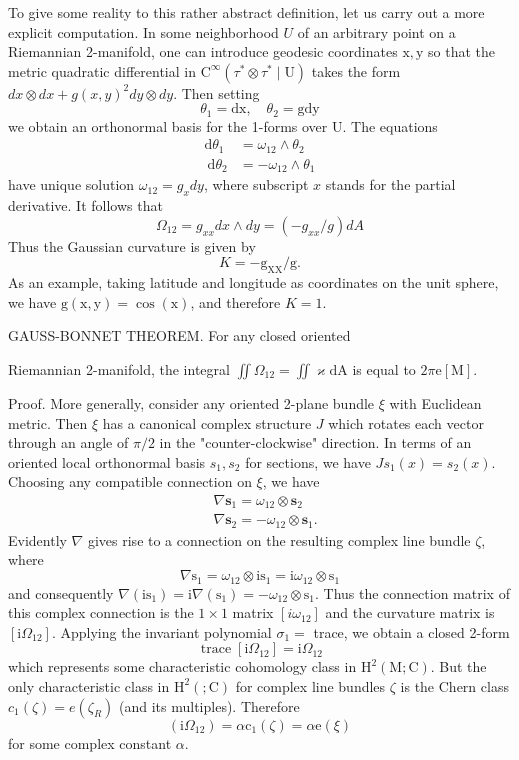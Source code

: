 \documentclass[10pt]{article}
\begin{document}
To give some reality to this rather abstract definition, let us carry out a more explicit computation. In some neighborhood $U$ of an arbitrary point on a Riemannian 2-manifold, one can introduce geodesic coordinates $\mathrm{x}, \mathrm{y}$ so that the metric quadratic differential in $\mathrm{C}^{\infty}\left(\tau^{*} \otimes \tau^{*} \mid \mathrm{U}\right)$ takes the form $d x \otimes d x+g(x, y)^{2} d y \otimes d y$. Then setting
$$
\theta_{1}=\mathrm{dx}, \quad \theta_{2}=\mathrm{gdy}
$$
we obtain an orthonormal basis for the 1-forms over U. The equations
$$
\begin{aligned}
\mathrm{d} \theta_{1} &=\omega_{12} \wedge \theta_{2} \\
\mathrm{~d} \theta_{2} &=-\omega_{12} \wedge \theta_{1}
\end{aligned}
$$
have unique solution $\omega_{12}=g_{x} d y$, where subscript $x$ stands for the partial derivative. It follows that
$$
\Omega_{12}=g_{x x} d x \wedge d y=\left(-g_{x x} / g\right) d A
$$
Thus the Gaussian curvature is given by
$$
K=-\mathrm{g}_{\mathrm{XX}} / \mathrm{g} .
$$
As an example, taking latitude and longitude as coordinates on the unit sphere, we have $\mathrm{g}(\mathrm{x}, \mathrm{y})=\cos (\mathrm{x})$, and therefore $K=1$.

GAUSS-BONNET THEOREM. For any closed oriented

Riemannian 2-manifold, the integral $\iint \Omega_{12}=\iint \varkappa \mathrm{dA}$ is equal to $2 \pi \mathrm{e}[\mathrm{M}]$.

Proof. More generally, consider any oriented 2-plane bundle $\xi$ with Euclidean metric. Then $\xi$ has a canonical complex structure $J$ which rotates each vector through an angle of $\pi / 2$ in the "counter-clockwise" direction. In terms of an oriented local orthonormal basis $s_{1}, s_{2}$ for sections, we have $J s_{1}(x)=s_{2}(x)$. Choosing any compatible connection on $\xi$, we have
$$
\begin{aligned}
&\nabla \mathbf{s}_{1}=\omega_{12} \otimes \mathbf{s}_{2} \\
&\nabla \mathbf{s}_{2}=-\omega_{12} \otimes \mathbf{s}_{1} .
\end{aligned}
$$
Evidently $\nabla$ gives rise to a connection on the resulting complex line bundle $\zeta$, where
$$
\nabla \mathrm{s}_{1}=\omega_{12} \otimes \mathrm{is}_{1}=\mathrm{i} \omega_{12} \otimes \mathrm{s}_{1}
$$
and consequently $\nabla\left(\mathrm{is}_{1}\right)=\mathrm{i} \nabla\left(\mathrm{s}_{1}\right)=-\omega_{12} \otimes \mathrm{s}_{1}$. Thus the connection matrix of this complex connection is the $1 \times 1$ matrix $\left[i \omega_{12}\right]$ and the curvature matrix is $\left[\mathrm{i} \Omega_{12}\right]$. Applying the invariant polynomial $\sigma_{1}=$ trace, we obtain a closed 2-form
$$
\operatorname{trace}\left[\mathrm{i} \Omega_{12}\right]=\mathrm{i} \Omega_{12}
$$
which represents some characteristic cohomology class in $\mathrm{H}^{2}(\mathrm{M} ; \mathrm{C})$. But the only characteristic class in $\mathrm{H}^{2}(; \mathrm{C})$ for complex line bundles $\zeta$ is the Chern class $c_{1}(\zeta)=e\left(\zeta_{R}\right)$ (and its multiples). Therefore
$$
\left(\mathrm{i} \Omega_{12}\right)=\alpha \mathrm{c}_{1}(\zeta)=\alpha \mathrm{e}(\xi)
$$
for some complex constant $\alpha$.
\end{document}
